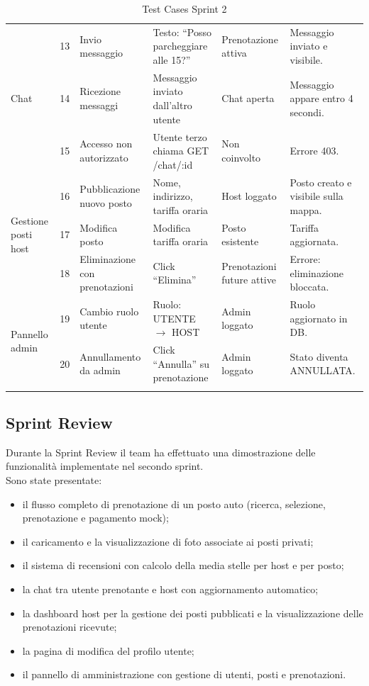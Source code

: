 \documentclass[a4paper,12pt]{article}
\begin{document}
\begin{longtable}{|l|c|p{2.8cm}|p{2.5cm}|p{1.8cm}|p{2.8cm}|}
\hline
\multirow{3}{*}{Chat}
 & 13 & Invio messaggio              & Testo: ``Posso parcheggiare alle 15?'' & Prenotazione attiva & Messaggio inviato e visibile. \\
\cline{2-6}
 & 14 & Ricezione messaggi           & Messaggio inviato dall'altro utente & Chat aperta  & Messaggio appare entro 4 secondi. \\
\cline{2-6}
 & 15 & Accesso non autorizzato      & Utente terzo chiama GET /chat/:id & Non coinvolto & Errore 403. \\
\hline
\multirow{3}{*}{Gestione posti host}
 & 16 & Pubblicazione nuovo posto    & Nome, indirizzo, tariffa oraria & Host loggato   & Posto creato e visibile sulla mappa. \\
\cline{2-6}
 & 17 & Modifica posto               & Modifica tariffa oraria        & Posto esistente  & Tariffa aggiornata. \\
\cline{2-6}
 & 18 & Eliminazione con prenotazioni & Click ``Elimina''             & Prenotazioni future attive & Errore: eliminazione bloccata. \\
\hline
\multirow{2}{*}{Pannello admin}
 & 19 & Cambio ruolo utente          & Ruolo: UTENTE $\rightarrow$ HOST & Admin loggato  & Ruolo aggiornato in DB. \\
\cline{2-6}
 & 20 & Annullamento da admin        & Click ``Annulla'' su prenotazione & Admin loggato & Stato diventa ANNULLATA. \\
\hline
\caption{Test Cases Sprint 2}
\end{longtable}

\subsection{Sprint Review}

Durante la Sprint Review il team ha effettuato una dimostrazione delle funzionalità
implementate nel secondo sprint.\\[0.3em]
Sono state presentate:

\begin{itemize}
  \item il flusso completo di prenotazione di un posto auto (ricerca, selezione,
        prenotazione e pagamento mock);
  \item il caricamento e la visualizzazione di foto associate ai posti privati;
  \item il sistema di recensioni con calcolo della media stelle per host e per posto;
  \item la chat tra utente prenotante e host con aggiornamento automatico;
  \item la dashboard host per la gestione dei posti pubblicati e la visualizzazione
        delle prenotazioni ricevute;
  \item la pagina di modifica del profilo utente;
  \item il pannello di amministrazione con gestione di utenti, posti e prenotazioni.
\end{itemize}
\end{document}
